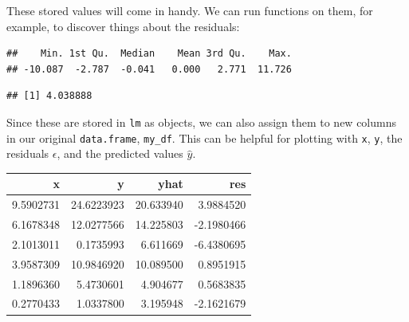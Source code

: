 \documentclass[]{book}
\newenvironment{Shaded}{\begin{snugshade}}{\end{snugshade}}
\newcommand{\KeywordTok}[1]{\textcolor[rgb]{0.13,0.29,0.53}{\textbf{#1}}}
\newcommand{\CommentTok}[1]{\textcolor[rgb]{0.56,0.35,0.01}{\textit{#1}}}
\newcommand{\OperatorTok}[1]{\textcolor[rgb]{0.81,0.36,0.00}{\textbf{#1}}}
\newcommand{\NormalTok}[1]{#1}
\theoremstyle{definition}
\theoremstyle{definition}
\theoremstyle{definition}
\theoremstyle{remark}
\begin{document}
These stored values will come in handy. We can run functions on them,
for example, to discover things about the residuals:

\begin{Shaded}
\end{Shaded}

\begin{verbatim}
##    Min. 1st Qu.  Median    Mean 3rd Qu.    Max. 
## -10.087  -2.787  -0.041   0.000   2.771  11.726
\end{verbatim}

\begin{Shaded}
\end{Shaded}

\begin{verbatim}
## [1] 4.038888
\end{verbatim}

Since these are stored in \texttt{lm} as objects, we can also assign
them to new columns in our original \texttt{data.frame},
\texttt{my\_df}. This can be helpful for plotting with \texttt{x},
\texttt{y}, the residuals \(\epsilon\), and the predicted values
\(\hat{y}\).

\begin{Shaded}
\end{Shaded}

\begin{tabular}{r|r|r|r}
\hline
x & y & yhat & res\\
\hline
9.5902731 & 24.6223923 & 20.633940 & 3.9884520\\
\hline
6.1678348 & 12.0277566 & 14.225803 & -2.1980466\\
\hline
2.1013011 & 0.1735993 & 6.611669 & -6.4380695\\
\hline
3.9587309 & 10.9846920 & 10.089500 & 0.8951915\\
\hline
1.1896360 & 5.4730601 & 4.904677 & 0.5683835\\
\hline
0.2770433 & 1.0337800 & 3.195948 & -2.1621679\\
\hline
\end{tabular}
\end{document}
